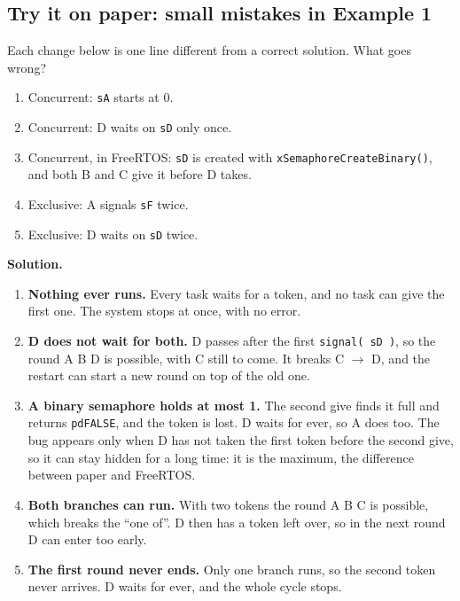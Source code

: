 \subsection{Try it on paper: small mistakes in Example 1}
Each change below is one line different from a correct solution. What goes wrong?
\begin{enumerate}
    \item Concurrent: \texttt{sA} starts at 0.
    \item Concurrent: D waits on \texttt{sD} only once.
    \item Concurrent, in FreeRTOS: \texttt{sD} is created with \texttt{xSemaphoreCreateBinary()}, and both B and C give it before D takes.
    \item Exclusive: A signals \texttt{sF} twice.
    \item Exclusive: D waits on \texttt{sD} twice.
\end{enumerate}
\textbf{Solution.}
\begin{enumerate}
    \item \textbf{Nothing ever runs.} Every task waits for a token, and no task can give the first one. The system stops at once, with no error.
    \item \textbf{D does not wait for both.} D passes after the first \texttt{signal( sD )}, so the round A B D is possible, with C still to come. It breaks C $\rightarrow$ D, and the restart can start a new round on top of the old one.
    \item \textbf{A binary semaphore holds at most 1.} The second give finds it full and returns \texttt{pdFALSE}, and the token is lost. D waits for ever, so A does too. The bug appears only when D has not taken the first token before the second give, so it can stay hidden for a long time: it is the maximum, the difference between paper and FreeRTOS.
    \item \textbf{Both branches can run.} With two tokens the round A B C is possible, which breaks the ``one of''. D then has a token left over, so in the next round D can enter too early.
    \item \textbf{The first round never ends.} Only one branch runs, so the second token never arrives. D waits for ever, and the whole cycle stops.
\end{enumerate}

